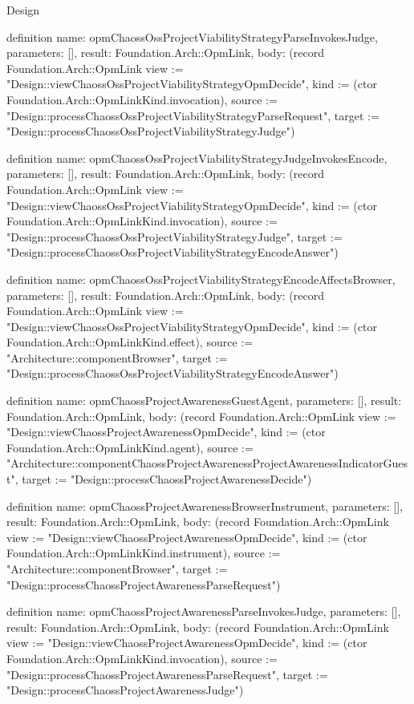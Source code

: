 \begin{lexlean}{Design}
\begin{semanticmodule}
definition{
  name: opmChaossOssProjectViabilityStrategyParseInvokesJudge,
  parameters: [],
  result: Foundation.Arch::OpmLink,
  body: (record Foundation.Arch::OpmLink {view := "Design::viewChaossOssProjectViabilityStrategyOpmDecide", kind := (ctor Foundation.Arch::OpmLinkKind.invocation), source := "Design::processChaossOssProjectViabilityStrategyParseRequest", target := "Design::processChaossOssProjectViabilityStrategyJudge"})
}

definition{
  name: opmChaossOssProjectViabilityStrategyJudgeInvokesEncode,
  parameters: [],
  result: Foundation.Arch::OpmLink,
  body: (record Foundation.Arch::OpmLink {view := "Design::viewChaossOssProjectViabilityStrategyOpmDecide", kind := (ctor Foundation.Arch::OpmLinkKind.invocation), source := "Design::processChaossOssProjectViabilityStrategyJudge", target := "Design::processChaossOssProjectViabilityStrategyEncodeAnswer"})
}

definition{
  name: opmChaossOssProjectViabilityStrategyEncodeAffectsBrowser,
  parameters: [],
  result: Foundation.Arch::OpmLink,
  body: (record Foundation.Arch::OpmLink {view := "Design::viewChaossOssProjectViabilityStrategyOpmDecide", kind := (ctor Foundation.Arch::OpmLinkKind.effect), source := "Architecture::componentBrowser", target := "Design::processChaossOssProjectViabilityStrategyEncodeAnswer"})
}

definition{
  name: opmChaossProjectAwarenessGuestAgent,
  parameters: [],
  result: Foundation.Arch::OpmLink,
  body: (record Foundation.Arch::OpmLink {view := "Design::viewChaossProjectAwarenessOpmDecide", kind := (ctor Foundation.Arch::OpmLinkKind.agent), source := "Architecture::componentChaossProjectAwarenessProjectAwarenessIndicatorGuest", target := "Design::processChaossProjectAwarenessDecide"})
}

definition{
  name: opmChaossProjectAwarenessBrowserInstrument,
  parameters: [],
  result: Foundation.Arch::OpmLink,
  body: (record Foundation.Arch::OpmLink {view := "Design::viewChaossProjectAwarenessOpmDecide", kind := (ctor Foundation.Arch::OpmLinkKind.instrument), source := "Architecture::componentBrowser", target := "Design::processChaossProjectAwarenessParseRequest"})
}

definition{
  name: opmChaossProjectAwarenessParseInvokesJudge,
  parameters: [],
  result: Foundation.Arch::OpmLink,
  body: (record Foundation.Arch::OpmLink {view := "Design::viewChaossProjectAwarenessOpmDecide", kind := (ctor Foundation.Arch::OpmLinkKind.invocation), source := "Design::processChaossProjectAwarenessParseRequest", target := "Design::processChaossProjectAwarenessJudge"})
}


\end{semanticmodule}
\end{lexlean}
